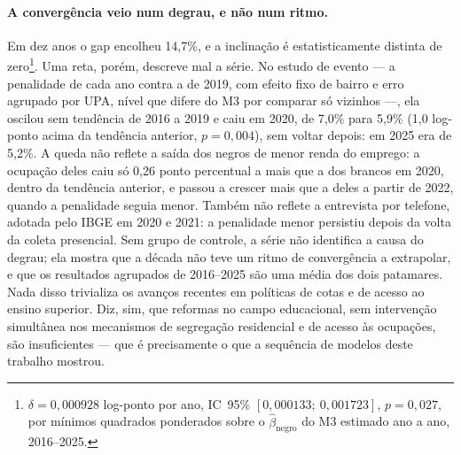 \documentclass[11pt, a4paper, oneside]{article}
\begin{document}
\paragraph{A convergência veio num degrau, e não num ritmo.}
Em dez anos o gap encolheu 14{,}7\%, e a inclinação é estatisticamente distinta de zero\footnote{$\delta = 0{,}000928$ log-ponto por ano, IC~95\% $[0{,}000133;\ 0{,}001723]$, $p = 0{,}027$, por mínimos quadrados ponderados sobre o $\hat\beta_{\text{negro}}$ do M3 estimado ano a ano, 2016--2025.}. Uma reta, porém, descreve mal a série. No estudo de evento --- a penalidade de cada ano contra a de 2019, com efeito fixo de bairro e erro agrupado por UPA, nível que difere do M3 por comparar só vizinhos ---, ela oscilou sem tendência de 2016 a 2019 e caiu em 2020, de 7{,}0\% para 5{,}9\% (1{,}0 log-ponto acima da tendência anterior, $p = 0{,}004$), sem voltar depois: em 2025 era de 5{,}2\%. A queda não reflete a saída dos negros de menor renda do emprego: a ocupação deles caiu só 0{,}26 ponto percentual a mais que a dos brancos em 2020, dentro da tendência anterior, e passou a crescer mais que a deles a partir de 2022, quando a penalidade seguia menor. Também não reflete a entrevista por telefone, adotada pelo IBGE em 2020 e 2021: a penalidade menor persistiu depois da volta da coleta presencial. Sem grupo de controle, a série não identifica a causa do degrau; ela mostra que a década não teve um ritmo de convergência a extrapolar, e que os resultados agrupados de 2016--2025 são uma média dos dois patamares. Nada disso trivializa os avanços recentes em políticas de cotas e de acesso ao ensino superior. Diz, sim, que reformas no campo educacional, sem intervenção simultânea nos mecanismos de segregação residencial e de acesso às ocupações, são insuficientes --- que é precisamente o que a sequência de modelos deste trabalho mostrou.
\end{document}
